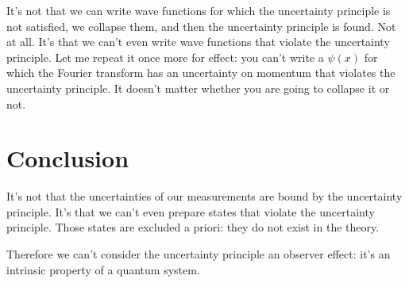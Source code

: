 \documentclass[aps,pra,10pt,floatfix,nofootinbib]{revtex4-1}
\theoremstyle{definition}
\begin{document}
It's not that we can write wave functions for which the uncertainty principle is not satisfied, we collapse them, and then the uncertainty principle is found. Not at all. It's that we can't even write wave functions that violate the uncertainty principle. Let me repeat it once more for effect: you can't write a $\psi(x)$ for which the Fourier transform has an uncertainty on momentum that violates the uncertainty principle. It doesn't matter whether you are going to collapse it or not.

\section{Conclusion}

It's not that the uncertainties of our measurements are bound by the uncertainty principle. It's that we can't even prepare states that violate the uncertainty principle. Those states are excluded a priori: they do not exist in the theory.

Therefore we can't consider the uncertainty principle an observer effect: it's an intrinsic property of a quantum system.
\end{document}
